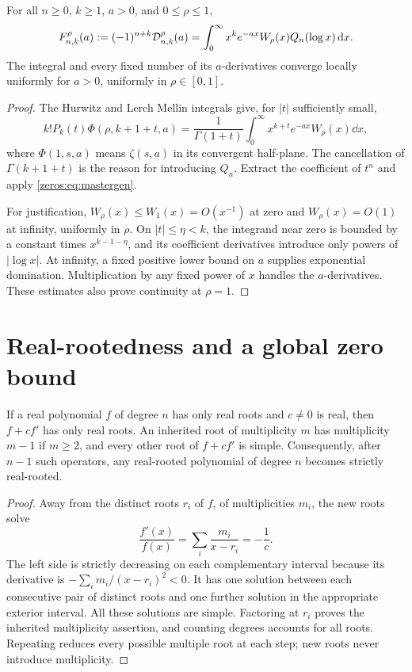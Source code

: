 \begin{theorem}\label{zeros:thm:laplace}
For all $n\geq0$, $k\geq1$, $a>0$, and $0\leq\rho\leq1$,
\begin{equation}\label{zeros:eq:laplace}
 F_{n,k}^{\rho}(a):=(-1)^{n+k}\mathcal D_{n,k}^{\rho}(a)
   =\int_0^\infty x^k e^{-ax}W_\rho(x)Q_n(\log x)\,\mathrm d x.
\end{equation}
The integral and every fixed number of its $a$-derivatives converge locally uniformly for $a>0$, uniformly in $\rho\in[0,1]$.
\end{theorem}
\begin{proof}
The Hurwitz and Lerch Mellin integrals give, for $|t|$ sufficiently small,
\[
 k!P_k(t)\Phi(\rho,k+1+t,a)
   =\frac1{\Gamma(1+t)}\int_0^\infty x^{k+t}e^{-ax}W_\rho(x)\dd x,
\]
where $\Phi(1,s,a)$ means $\zeta(s,a)$ in its convergent half-plane. The cancellation of $\Gamma(k+1+t)$ is the reason for introducing $Q_n$. Extract the coefficient of $t^n$ and apply \eqref{zeros:eq:mastergen}.

For justification, $W_\rho(x)\leq W_1(x)=O(x^{-1})$ at zero and $W_\rho(x)=O(1)$ at infinity, uniformly in $\rho$. On $|t|\leq\eta<k$, the integrand near zero is bounded by a constant times $x^{k-1-\eta}$, and its coefficient derivatives introduce only powers of $|\log x|$. At infinity, a fixed positive lower bound on $a$ supplies exponential domination. Multiplication by any fixed power of $x$ handles the $a$-derivatives. These estimates also prove continuity at $\rho=1$.
\end{proof}

\section{Real-rootedness and a global zero bound}
\label{zeros:sec:zerobound}

\begin{lemma}\label{zeros:lem:operator}
If a real polynomial $f$ of degree $n$ has only real roots and $c\neq0$ is real, then $f+cf'$ has only real roots. An inherited root of multiplicity $m$ has multiplicity $m-1$ if $m\geq2$, and every other root of $f+cf'$ is simple. Consequently, after $n-1$ such operators, any real-rooted polynomial of degree $n$ becomes strictly real-rooted.
\end{lemma}
\begin{proof}
Away from the distinct roots $r_i$ of $f$, of multiplicities $m_i$, the new roots solve
\[
 \frac{f'(x)}{f(x)}=\sum_i\frac{m_i}{x-r_i}=-\frac1c.
\]
The left side is strictly decreasing on each complementary interval because its derivative is $-\sum_i m_i/(x-r_i)^2<0$. It has one solution between each consecutive pair of distinct roots and one further solution in the appropriate exterior interval. All these solutions are simple. Factoring at $r_i$ proves the inherited multiplicity assertion, and counting degrees accounts for all roots. Repeating reduces every possible multiple root at each step; new roots never introduce multiplicity.
\end{proof}

